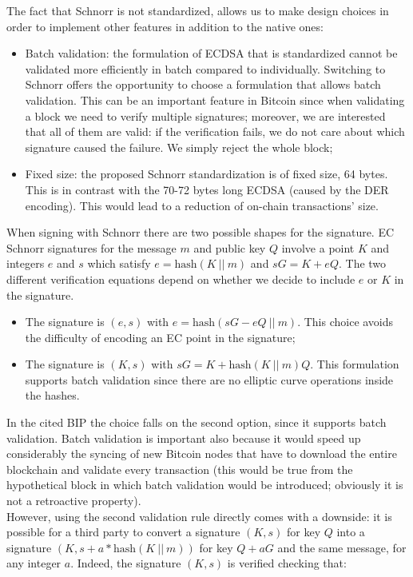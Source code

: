 \bigskip
\noindent
The fact that Schnorr is not standardized, allows us to make design choices in order to implement other features in addition to the native ones:
\begin{itemize}
	\item Batch validation: the formulation of ECDSA that is standardized cannot be validated more efficiently in batch compared to individually. Switching to Schnorr offers the opportunity to choose a formulation that allows batch validation. This can be an important feature in Bitcoin since when validating a block we need to verify multiple signatures; moreover, we are interested that all of them are valid: if the verification fails, we do not care about which signature caused the failure. We simply reject the whole block;
	\item Fixed size: the proposed Schnorr standardization is of fixed size, 64 bytes. This is in contrast with the 70-72 bytes long ECDSA (caused by the DER encoding). This would lead to a reduction of on-chain transactions' size.
\end{itemize}
When signing with Schnorr there are two possible shapes for the signature. EC Schnorr signatures for the message $m$ and public key $Q$ involve a point $K$ and integers $e$ and $s$ which satisfy $e = \text{hash}(K \ || \ m)$ and $sG = K + eQ$. The two different verification equations depend on whether we decide to include $e$ or $K$ in the signature.
\begin{itemize}
	\item The signature is $(e, s)$ with $e = \text{hash}(sG - eQ \ || \ m)$. This choice avoids the difficulty of encoding an EC point in the signature;
	\item The signature is $(K, s)$ with $sG = K + \text{hash}(K \ || \ m)Q$. This formulation supports batch validation since there are no elliptic curve operations inside the hashes.
\end{itemize}
In the cited BIP the choice falls on the second option, since it supports batch validation. Batch validation is important also because it would speed up considerably the syncing of new Bitcoin nodes that have to download the entire blockchain and validate every transaction (this would be true from the hypothetical block in which batch validation would be introduced; obviously it is not a retroactive property).
\\
However, using the second validation rule directly comes with a downside: it is possible for a third party to convert a signature $(K, s)$ for key $Q$ into a signature $(K, s + a*\text{hash}(K \ || \ m))$ for key $Q + aG$ and the same message, for any integer $a$. Indeed, the signature $(K, s)$ is verified checking that: 
